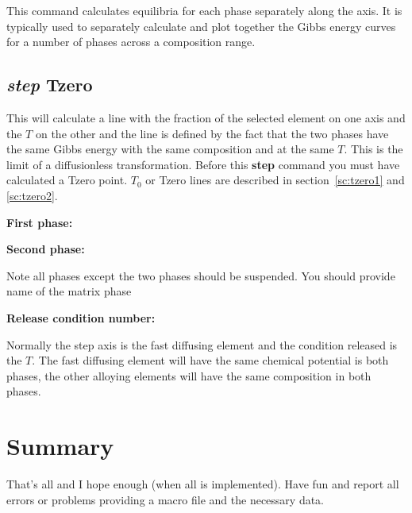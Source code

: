 \documentclass[11pt]{article}
\begin{document}
This command calculates equilibria for each phase separately along the
axis.  It is typically used to separately calculate and plot together
the Gibbs energy curves for a number of phases across a composition
range.

\hypertarget{Step Tzero}{}
\subsection{{\em step} Tzero}\label{sc:tzero3}

This will calculate a line with the fraction of the selected element
on one axis and the $T$ on the other and the line is defined by the
fact that the two phases have the same Gibbs energy with the same
composition and at the same $T$.  This is the limit of a diffusionless
transformation.  Before this {\bf step} command you must have
calculated a Tzero point.  $T_0$ or Tzero lines are described in
section~\ref{sc:tzero1} and \ref{sc:tzero2}.

{\bf First phase:}
              
{\bf Second phase:}

Note all phases except the two phases should be suspended.  You should
provide name of the matrix phase

{\bf Release condition number:}

Normally the step axis is the fast diffusing element and the condition
released is the $T$.  The fast diffusing element will have the same
chemical potential is both phases, the other alloying elements will
have the same composition in both phases.



\hypertarget{Summary}{}
\section{Summary }

That's all and I hope enough (when all is implemented).  Have fun and
report all errors or problems providing a macro file and the necessary
data.
\end{document}
